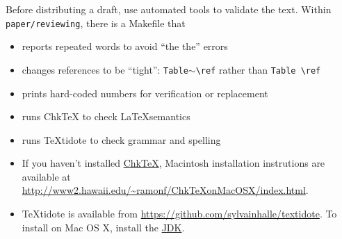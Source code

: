 Before distributing a draft, use automated tools to validate the text.
Within \texttt{paper/reviewing}, there is a Makefile that
\begin{itemize}
	\item reports repeated words to avoid ``the the'' errors
	\item changes references to be ``tight'': \texttt{Table$\scriptstyle\sim$\textbackslash{}ref} rather than \texttt{Table \textbackslash{}ref}
	\item prints hard-coded numbers for verification or replacement
	\item runs ChkTeX to check \LaTeX semantics
	\item runs TeXtidote to check grammar and spelling
\end{itemize}

\begin{itemize}
\item
If you haven't installed \href{https://ctan.org/pkg/chktex?lang=en}{ChkTeX}, Macintosh installation instrutions are available at \url{http://www2.hawaii.edu/~ramonf/ChkTeXonMacOSX/index.html}.
\item
TeXtidote is available from \url{https://github.com/sylvainhalle/textidote}.
To install on Mac OS X, install the \href{https://www.oracle.com/technetwork/java/javase/downloads/jdk8-downloads-2133151.html}{JDK}.
\end{itemize}
